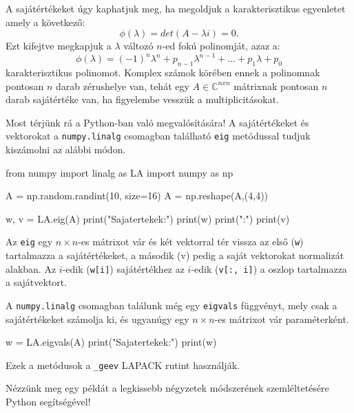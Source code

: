    A sajátértékeket úgy kaphatjuk meg, ha megoldjuk a karakterisztikus
egyenletet amely a következő:
\[
\phi(\lambda) = det(A-\lambda i) = 0.
\]
Ezt kifejtve megkapjuk a \(\lambda\) változó \(n\)-ed fokú polinomját, azaz a:
\[
\phi(\lambda)=(-1)^n\lambda^n+p_{n-1}\lambda^{n-1}+\dots+p_1\lambda+p_0
\]
karakterisztikus polinomot. Komplex számok körében ennek a polinomnak
pontosan \(n\) darab zérushelye van, tehát egy \(A\in \mathbb{C}^{nxn}\)
mátrixnak pontosan \(n\) darab sajátértéke van, ha figyelembe vesszük a
multiplicitásokat.

    Most térjünk rá a Python-ban való megvalósítására! A sajátértékeket és
vektorokat a \texttt{numpy.linalg} csomagban található \texttt{eig} metódussal
tudjuk kiszámolni az alábbi módon.
\begin{python}
from numpy import linalg as LA
import numpy as np

A = np.random.randint(10, size=16)
A = np.reshape(A,(4,4))

w, v = LA.eig(A)
print("Sajatertekek:\n")
print(w)
print("\nSajatvektorok:\n")
print(v)
\end{python}
    Az \texttt{eig} egy \(n \times n\)-es mátrixot vár és két vektorral tér vissza
az első (\texttt{w}) tartalmazza a sajátértékeket, a második (v) pedig a saját
vektorokat normalizát alakban. Az $i$-edik (\texttt{w[i]}) sajátértékhez az
$i$-edik (\texttt{v[:, i]}) a oszlop tartalmazza a sajátvektort.

    A \texttt{numpy.linalg} csomagban találunk még egy \texttt{eigvals} függvényt, mely csak a
sajátértékeket számolja ki, és ugyanúgy egy \(n \times n\)-es mátrixot vár
paraméterként.
\begin{python}
w = LA.eigvals(A)
print("Sajatertekek:\n")
print(w)
\end{python}
Ezek a metódusok a \texttt{\_geev} LAPACK rutint használják.


Nézzünk meg egy példát a legkissebb négyzetek módszerének szemléltetésére Python segítségével!

